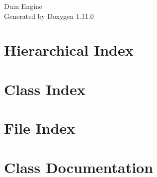 \documentclass[twoside]{book}
\newcommand{\+}{\discretionary{\mbox{\scriptsize$\hookleftarrow$}}{}{}}
\newcommand{\clearemptydoublepage}{%
    \newpage{\pagestyle{empty}\cleardoublepage}%
  }
\begin{document}
  \raggedbottom
    \hypersetup{pageanchor=false,
                bookmarksnumbered=true,
                pdfencoding=unicode
               }
  \begin{titlepage}
  \vspace*{7cm}
  \begin{center}%
  {\Large Duin Engine}\\
  \vspace*{1cm}
  {\large Generated by Doxygen 1.11.0}\\
  \end{center}
  \end{titlepage}
  \clearemptydoublepage
  \tableofcontents
  \clearemptydoublepage
  \hypersetup{pageanchor=true}
\chapter{Hierarchical Index}

\chapter{Class Index}

\chapter{File Index}

\chapter{Class Documentation}















































\end{document}
